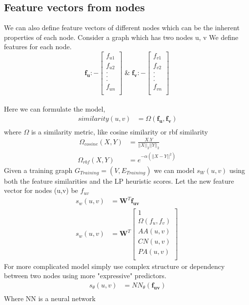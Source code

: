 \documentclass{article}
\begin{document}
\subsection{Feature vectors from nodes}
We can also define feature vectors of different nodes which can be the inherent properties of each node.
Consider a graph which has two nodes u, v
We define features for each node.
\begin{equation}
\mathbf{f_u}  :- 
\begin{bmatrix}
f_{u1} \\
f_{u2} \\
.\\
.\\
.\\
f_{un} \\
\end{bmatrix}  \; \& \;
\mathbf{f_v} :- 
\begin{bmatrix}
f_{v1} \\
f_{v2} \\
.\\
.\\
.\\
f_{vn} \\
\end{bmatrix}
\end{equation}
\\
Here we can formulate the model,
\begin{align} \
similarity(u, v) & = \Omega(\mathbf{f_u} , \mathbf{f_v}) \\
\end{align}
where $\Omega$ is a similarity metric, like cosine similarity or rbf similarity
\begin{align} \
\Omega_{cosine}(X, Y) & = \frac{X.Y}{||X||_2 ||Y||_2} \\
\Omega_{rbf}(X, Y) & = e^{-\alpha(||X-Y||^2)}
\end{align}
Given a training graph $ G_{Training} = (V, E_{Training}) $ we can model $s_W(u, v) $ using both the feature similarities and the LP heuristic scores. Let the new feature vector for nodes (u,v) be $f_{uv}$
\begin{align}
s_w(u,v) & = \textbf{W}^T\mathbf{f_{uv}} \\
s_w(u,v) & = \textbf{W}^T 
\begin{bmatrix}
1\\
\Omega(f_u, f_v) \\
AA(u, v)\\
CN(u, v)\\
PA(u, v)\\
\end{bmatrix}
\end{align}
For more complicated model simply use complex structure or dependency between two nodes using more "expressive" predictors.\\
\begin{align} \
s_\theta(u, v) & =NN_\theta(\mathbf{f_{uv}}) \\
\end{align}
Where NN is a neural network\\
\end{document}
